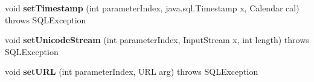 \begin{DoxyCompactItemize}
\item 
\mbox{\label{classcom_1_1mysql_1_1cj_1_1jdbc_1_1_client_prepared_statement_a79b4a88871939c15a8425dc0a40304ef}} 
void {\bfseries set\+Timestamp} (int parameter\+Index, java.\+sql.\+Timestamp x, Calendar cal)  throws S\+Q\+L\+Exception 
\item 
\mbox{\label{classcom_1_1mysql_1_1cj_1_1jdbc_1_1_client_prepared_statement_a5548cb04b0d38d6af22ad76fa774cf56}} 
void {\bfseries set\+Unicode\+Stream} (int parameter\+Index, Input\+Stream x, int length)  throws S\+Q\+L\+Exception 
\item 
\mbox{\label{classcom_1_1mysql_1_1cj_1_1jdbc_1_1_client_prepared_statement_a5f83d136ca933d21967fae30a75a5430}} 
void {\bfseries set\+U\+RL} (int parameter\+Index, U\+RL arg)  throws S\+Q\+L\+Exception 
\end{DoxyCompactItemize}
